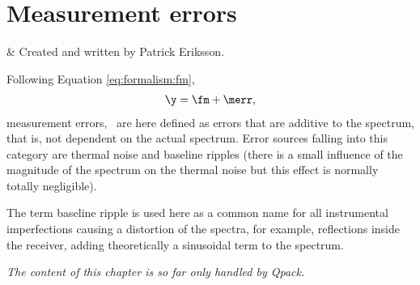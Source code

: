 \graphicspath{{Figs/measerr/}}
%
%
\chapter{Measurement errors}
 \label{sec:measerr}


%
%
 & Created and written by Patrick Eriksson.\\
\stophistory


%
%
%



%
%
Following Equation \ref{eq:formalism:fm},
\begin{eqnarray}
   \y = \fm + \merr, \nonumber
\end{eqnarray}
measurement errors, \merr\, are here defined as errors that are
additive to the spectrum, that is, not dependent on the actual spectrum.
Error sources falling into this category are thermal noise and
baseline ripples (there is a small influence of the magnitude of the
spectrum on the thermal noise but this effect is normally totally
negligible).

The term baseline ripple is used here as a common name for all instrumental
imperfections causing a distortion of the spectra, for example,
reflections inside the receiver, adding theoretically a sinusoidal term
to the spectrum.

{\it The content of this chapter is so far only handled by Qpack.}



